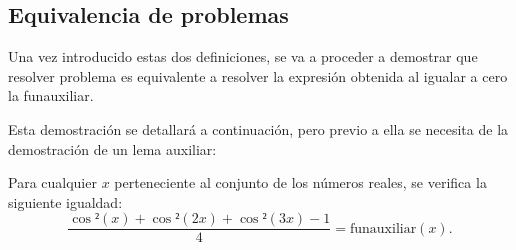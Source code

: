 \subsection{Equivalencia de problemas}
Una vez introducido estas dos definiciones, se va a proceder
a demostrar que resolver problema es
equivalente a resolver la expresión obtenida al igualar a
cero la funauxiliar.

Esta demostración se detallará a continuación, pero previo a
ella se necesita de la demostración de un lema auxiliar:

\begin{lema}[Igualdad]\label{igualdadlema}
  Para cualquier \(x\) perteneciente al conjunto de los
  números reales, se verifica la siguiente igualdad:
  \begin{equation}\label{lemaigualdad}
    \frac{\cos²(x)+\cos²(2x)+\cos²(3x)-1}{4}=\text{funauxiliar}(x).
  \end{equation}
\end{lema}
